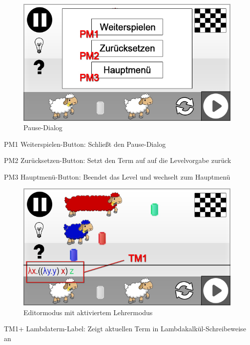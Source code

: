 \begin{figure}[H]
\centering
\includegraphics[scale=0.55]{../gui/_jpeg_numeration/game_paused.jpg}
\caption{Pause-Dialog}
\label{fig:Editormodus_Paused}
\end{figure}
\begin{description*}
\item[PM1] Weiterspielen-Button: Schließt den Pause-Dialog
\item[PM2] Zurücksetzen-Button: Setzt den Term auf auf die Levelvorgabe zurück
\item[PM3] Hauptmenü-Button: Beendet das Level und wechselt zum Hauptmenü
\end{description*}


\begin{figure}[H]
\centering
\includegraphics[scale=0.55]{../gui/_jpeg_numeration/game_teachermode.jpg}
\caption{Editormodus mit aktiviertem Lehrermodus}
\label{fig:Editormodus_TM}
\end{figure}
\begin{description*}
\item[TM1+] Lambdaterm-Label: Zeigt aktuellen Term in Lambdakalkül-Schreibeweise an
\end{description*}

